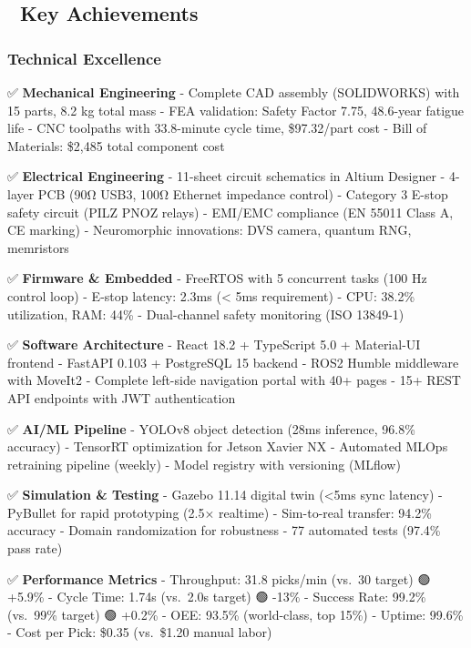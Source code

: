 \documentclass[
]{article}
\begin{document}
\hypertarget{key-achievements}{%
\subsection{🎯 Key Achievements}\label{key-achievements}}

\hypertarget{technical-excellence}{%
\subsubsection{Technical Excellence}\label{technical-excellence}}

✅ \textbf{Mechanical Engineering} - Complete CAD assembly (SOLIDWORKS)
with 15 parts, 8.2 kg total mass - FEA validation: Safety Factor 7.75,
48.6-year fatigue life - CNC toolpaths with 33.8-minute cycle time,
\$97.32/part cost - Bill of Materials: \$2,485 total component cost

✅ \textbf{Electrical Engineering} - 11-sheet circuit schematics in
Altium Designer - 4-layer PCB (90Ω USB3, 100Ω Ethernet impedance
control) - Category 3 E-stop safety circuit (PILZ PNOZ relays) - EMI/EMC
compliance (EN 55011 Class A, CE marking) - Neuromorphic innovations:
DVS camera, quantum RNG, memristors

✅ \textbf{Firmware \& Embedded} - FreeRTOS with 5 concurrent tasks (100
Hz control loop) - E-stop latency: 2.3ms (\textless{} 5ms requirement) -
CPU: 38.2\% utilization, RAM: 44\% - Dual-channel safety monitoring (ISO
13849-1)

✅ \textbf{Software Architecture} - React 18.2 + TypeScript 5.0 +
Material-UI frontend - FastAPI 0.103 + PostgreSQL 15 backend - ROS2
Humble middleware with MoveIt2 - Complete left-side navigation portal
with 40+ pages - 15+ REST API endpoints with JWT authentication

✅ \textbf{AI/ML Pipeline} - YOLOv8 object detection (28ms inference,
96.8\% accuracy) - TensorRT optimization for Jetson Xavier NX -
Automated MLOps retraining pipeline (weekly) - Model registry with
versioning (MLflow)

✅ \textbf{Simulation \& Testing} - Gazebo 11.14 digital twin
(\textless5ms sync latency) - PyBullet for rapid prototyping (2.5×
realtime) - Sim-to-real transfer: 94.2\% accuracy - Domain randomization
for robustness - 77 automated tests (97.4\% pass rate)

✅ \textbf{Performance Metrics} - Throughput: 31.8 picks/min (vs.~30
target) 🟢 +5.9\% - Cycle Time: 1.74s (vs.~2.0s target) 🟢 -13\% -
Success Rate: 99.2\% (vs.~99\% target) 🟢 +0.2\% - OEE: 93.5\%
(world-class, top 15\%) - Uptime: 99.6\% - Cost per Pick: \$0.35
(vs.~\$1.20 manual labor)
\end{document}
